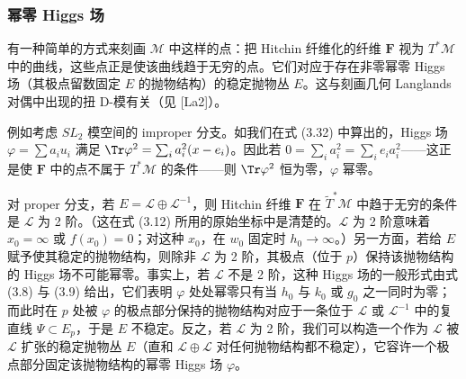 \subsubsection{幂零 Higgs 场}

有一种简单的方式来刻画 $\mathcal{M}$ 中这样的点：把 Hitchin 纤维化的纤维 $\boldsymbol{F}$ 视为 $T^*\mathcal{M}$ 中的曲线，这些点正是使该曲线趋于无穷的点。它们对应于存在非零幂零 Higgs 场（其极点留数固定 $E$ 的抛物结构）的稳定抛物丛 $E$。这与刻画几何 Langlands 对偶中出现的扭 D-模有关（见 [La2]）。

例如考虑 $SL_2$ 模空间的 improper 分支。如我们在式 (3.32) 中算出的，Higgs 场 $\varphi=\sum a_iu_i$ 满足 $\Tr\varphi^2=\sum_ia_i^2(x-e_i)$。因此若 $0=\sum_ia_i^2=\sum_ie_ia_i^2$——这正是使 $\boldsymbol{F}$ 中的点不属于 $T^*\mathcal{M}$ 的条件——则 $\Tr\varphi^2$ 恒为零，$\varphi$ 幂零。

对 proper 分支，若 $E=\mathcal{L}\oplus\mathcal{L}^{-1}$，则 Hitchin 纤维 $\boldsymbol{F}$ 在 $\tilde{T}^*\mathcal{M}$ 中趋于无穷的条件是 $\mathcal{L}$ 为 2 阶。（这在式 (3.12) 所用的原始坐标中是清楚的。$\mathcal{L}$ 为 2 阶意味着 $x_0=\infty$ 或 $f(x_0)=0$；对这种 $x_0$，在 $w_0$ 固定时 $h_0\to\infty$。）另一方面，若给 $E$ 赋予使其稳定的抛物结构，则除非 $\mathcal{L}$ 为 2 阶，其极点（位于 $p$）保持该抛物结构的 Higgs 场不可能幂零。事实上，若 $\mathcal{L}$ 不是 2 阶，这种 Higgs 场的一般形式由式 (3.8) 与 (3.9) 给出，它们表明 $\varphi$ 处处幂零只有当 $h_0$ 与 $k_0$ 或 $g_0$ 之一同时为零；而此时在 $p$ 处被 $\varphi$ 的极点部分保持的抛物结构对应于一条位于 $\mathcal{L}$ 或 $\mathcal{L}^{-1}$ 中的复直线 $\Psi\subset E_p$，于是 $E$ 不稳定。反之，若 $\mathcal{L}$ 为 2 阶，我们可以构造一个作为 $\mathcal{L}$ 被 $\mathcal{L}$ 扩张的稳定抛物丛 $E$（直和 $\mathcal{L}\oplus\mathcal{L}$ 对任何抛物结构都不稳定），它容许一个极点部分固定该抛物结构的幂零 Higgs 场 $\varphi$。


